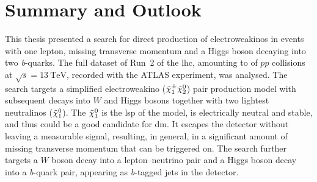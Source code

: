 

\chapter{Summary and Outlook}

\graphicspath{{chapter-summary/Figs/Vector/}{chapter-summary/Figs/}}

This thesis presented a search for direct production of electroweakinos in events with one lepton, missing transverse momentum and a Higgs boson decaying into two \textit{b}-quarks.
The full dataset of Run~2 of the \gls{lhc}, amounting to \onethirtynineifb of $pp$ collisions at $\sqrt{s} = \SI{13}{\TeV}$, recorded with the ATLAS experiment, was analysed.
The search targets a simplified electroweakino ($\tilde{\chi}_1^\pm\tilde{\chi}_2^0$) pair production model with subsequent decays into $W$ and Higgs bosons together with two lightest neutralinos ($\tilde{\chi}_1^0$). The $\tilde{\chi}_1^0$ is the \gls{lsp} of the model, is electrically neutral and stable, and thus could be a good candidate for \gls{dm}.
It escapes the detector without leaving a measurable signal, resulting, in general, in a significant amount of missing transverse momentum that can be triggered on.
The search further targets a $W$ boson decay into a lepton--neutrino pair and a Higgs boson decay into a \textit{b}-quark pair, appearing as \textit{b}-tagged jets in the detector.

